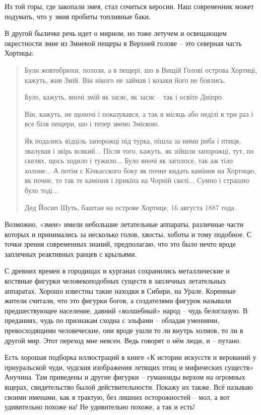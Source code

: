 Из той горы, где закопали змея, стал сочиться керосин. Наш современник может подумать, что у змия пробиты топливные баки.

В другой быличке речь идет о мирном, но тоже летучем и освещающем окрестности змие из Змиевой пещеры в Верхней голове – это северная часть Хортицы:

\begin{quotation}
Були жовтобрюхи, полози, а в пещері, шо в Вищій Голові острова Хортиці, кажуть, жив Змій. Він нікого не займав і козаки його не боялись.

Було, кажуть, вночі змій як засяє, як засяє – так і освіте Дніпро. 

Він, кажуть, не щоночі і показувався, а так в місяць або неділі в три раз і все біля пещери, шо і тепер звемо Змієвою. 

Як подались відціль запорожці під турка, пішла за ними риба і птиця, звалував і звірь всякий... Після того, кажуть, як зійшли запорожці, тут, по скелях, щось ходило і тужило... Було вночі як заголосе, так аж тіло холоне... А потім с Кічкасского боку як почне кидать каміння на Хортицю, як почне, то так те каміння і прикіпа на Чорній скелі... Сумно і страшно було тоді...

Дед Йосип Шуть, баштан на острове Хортице, 16 августа 1887 года.
\end{quotation}

Возможно, «змеи» имели небольшие летательные аппараты, различные части которых и принимались за несколько голов, хвосты, хоботы и тому подобное. С точки зрения современных знаний, предполагаю, что это было нечто вроде заплечных реактивных ранцев с крыльями.

С древних времен в городищах и курганах сохранились металлические и костяные фигурки человекоподобных существ в заплечных летательных аппаратах. Хорошо известны такие находки в Сибири, на Урале. Коренные жители считали, что это фигурки богов, а создателями фигурок называли предшествующее население, давний «волшебный» народ – чудь белоглазую. В преданиях, чудь по признакам сходна с эльфами – обладая умениями, превосходящими человеческие, они вроде ушли то ли внутрь холмов, то ли в другой мир. Этот переход мне неясен. Ведь говорят о нём люди, и – путано.

Есть хорошая подборка иллюстраций в книге «К истории искусств и верований у приуральской чуди, чудския изображения летящих птиц и мифических существ» Анучина\cite{anuchin01}. Там приведены и другие фигурки – гуманоиды верхом на огромных ящерах, свидетельство былой действительности. Покажу их также. Всё называю своими именами, как я трактую, без лишних осторожностей – мол, а вот удивительно похоже на! Не удивительно похоже, а так и есть!


